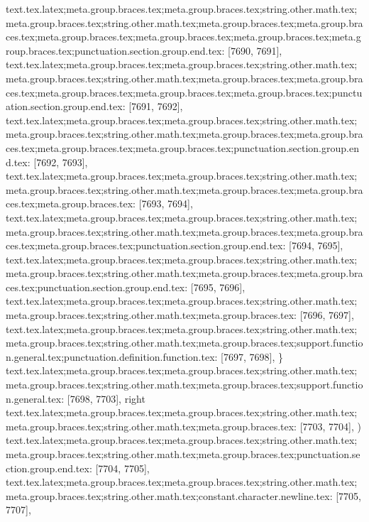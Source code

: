 {{{{{{{{{{{{{{{{{{{{{{{{{{{{{{{{{{{{{{{{{{{{{{{{{{{{{{{{{{{{{{{{{{{{{{{{{{{{{{{{{{{{{{{{{{{{{{{{{{{{{{{{{{{{{{{{{{{{{{{{{{{{{{{{{{{{{{{{{{{{{{{{{{{{{{{{{{{{{{{{{{{{{{{{{{{{{{{{{{{{{{{{{{{{{{{{{{{{{{{{{{{{{{{{{{{{{{{{{{{{{{{{text.tex.latex;meta.group.braces.tex;meta.group.braces.tex;string.other.math.tex;meta.group.braces.tex;string.other.math.tex;meta.group.braces.tex;meta.group.braces.tex;meta.group.braces.tex;meta.group.braces.tex;meta.group.braces.tex;meta.group.braces.tex;punctuation.section.group.end.tex: [7690, 7691], {}}
text.tex.latex;meta.group.braces.tex;meta.group.braces.tex;string.other.math.tex;meta.group.braces.tex;string.other.math.tex;meta.group.braces.tex;meta.group.braces.tex;meta.group.braces.tex;meta.group.braces.tex;meta.group.braces.tex;punctuation.section.group.end.tex: [7691, 7692], {}}
text.tex.latex;meta.group.braces.tex;meta.group.braces.tex;string.other.math.tex;meta.group.braces.tex;string.other.math.tex;meta.group.braces.tex;meta.group.braces.tex;meta.group.braces.tex;meta.group.braces.tex;punctuation.section.group.end.tex: [7692, 7693], {}}
text.tex.latex;meta.group.braces.tex;meta.group.braces.tex;string.other.math.tex;meta.group.braces.tex;string.other.math.tex;meta.group.braces.tex;meta.group.braces.tex;meta.group.braces.tex: [7693, 7694], { }
text.tex.latex;meta.group.braces.tex;meta.group.braces.tex;string.other.math.tex;meta.group.braces.tex;string.other.math.tex;meta.group.braces.tex;meta.group.braces.tex;meta.group.braces.tex;punctuation.section.group.end.tex: [7694, 7695], {}}
text.tex.latex;meta.group.braces.tex;meta.group.braces.tex;string.other.math.tex;meta.group.braces.tex;string.other.math.tex;meta.group.braces.tex;meta.group.braces.tex;punctuation.section.group.end.tex: [7695, 7696], {}}
text.tex.latex;meta.group.braces.tex;meta.group.braces.tex;string.other.math.tex;meta.group.braces.tex;string.other.math.tex;meta.group.braces.tex: [7696, 7697], { }
text.tex.latex;meta.group.braces.tex;meta.group.braces.tex;string.other.math.tex;meta.group.braces.tex;string.other.math.tex;meta.group.braces.tex;support.function.general.tex;punctuation.definition.function.tex: [7697, 7698], {\}
text.tex.latex;meta.group.braces.tex;meta.group.braces.tex;string.other.math.tex;meta.group.braces.tex;string.other.math.tex;meta.group.braces.tex;support.function.general.tex: [7698, 7703], {right}
text.tex.latex;meta.group.braces.tex;meta.group.braces.tex;string.other.math.tex;meta.group.braces.tex;string.other.math.tex;meta.group.braces.tex: [7703, 7704], {)}
text.tex.latex;meta.group.braces.tex;meta.group.braces.tex;string.other.math.tex;meta.group.braces.tex;string.other.math.tex;meta.group.braces.tex;punctuation.section.group.end.tex: [7704, 7705], {}}
text.tex.latex;meta.group.braces.tex;meta.group.braces.tex;string.other.math.tex;meta.group.braces.tex;string.other.math.tex;constant.character.newline.tex: [7705, 7707], {\\}
}}}}}}}}}}}}}}}}}}}}}}}}}}}}}}}}}}}}}}}}}}}}}}}}}}}}}}}}}}}}}}}}}}}}}}}}}}}}}}}}}}}}}}}}}}}}}}}}}}}}}}}}}}}}}}}}}}}}}}}}}}}}}}}}}}}}}}}}}}}}}}}}}}}}}}}}}}}}}}}}}}}}}}}}}}}}}}}}}}}}}}}}}}}}}}}}}}}}}}}}}}}}}}}}}}}}}}}}}}}
